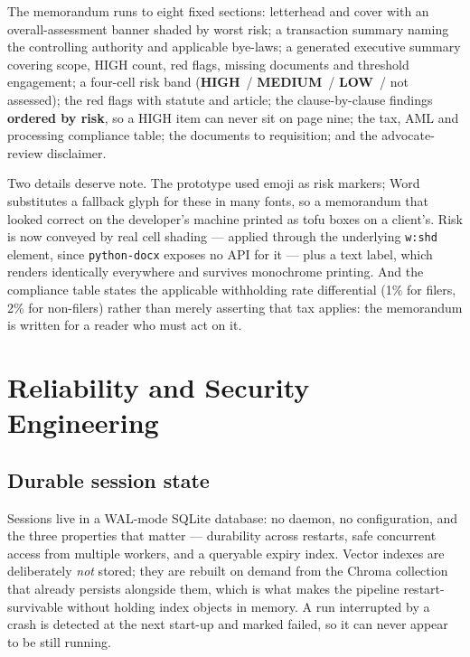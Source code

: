\documentclass[11pt,a4paper]{article}
\newcommand{\code}[1]{\texttt{\small #1}}
\newcommand{\HI}{\textcolor{riskred}{\textbf{HIGH}}}
\newcommand{\ME}{\textcolor{amber}{\textbf{MEDIUM}}}
\newcommand{\LO}{\textcolor{forest}{\textbf{LOW}}}
\begin{document}
The memorandum runs to eight fixed sections: letterhead and cover with an
overall-assessment banner shaded by worst risk; a transaction summary naming the
controlling authority and applicable bye-laws; a generated executive summary covering
scope, HIGH count, red flags, missing documents and threshold engagement; a four-cell risk
band (\HI\ / \ME\ / \LO\ / not assessed); the red flags with statute and article; the
clause-by-clause findings \textbf{ordered by risk}, so a HIGH item can never sit on page
nine; the tax, AML and processing compliance table; the documents to requisition; and the
advocate-review disclaimer.

Two details deserve note. The prototype used emoji as risk markers; Word substitutes a
fallback glyph for these in many fonts, so a memorandum that looked correct on the
developer's machine printed as tofu boxes on a client's. Risk is now conveyed by real cell
shading --- applied through the underlying \code{w:shd} element, since \code{python-docx}
exposes no API for it --- plus a text label, which renders identically everywhere and
survives monochrome printing. And the compliance table states the applicable withholding
rate differential (1\% for filers, 2\% for non-filers) rather than merely asserting that
tax applies: the memorandum is written for a reader who must act on it.

\section{Reliability and Security Engineering}

\subsection{Durable session state}

Sessions live in a WAL-mode SQLite database: no daemon, no configuration, and the three
properties that matter --- durability across restarts, safe concurrent access from multiple
workers, and a queryable expiry index. Vector indexes are deliberately \emph{not} stored;
they are rebuilt on demand from the Chroma collection that already persists alongside them,
which is what makes the pipeline restart-survivable without holding index objects in memory.
A run interrupted by a crash is detected at the next start-up and marked failed, so it can
never appear to be still running.
\end{document}
